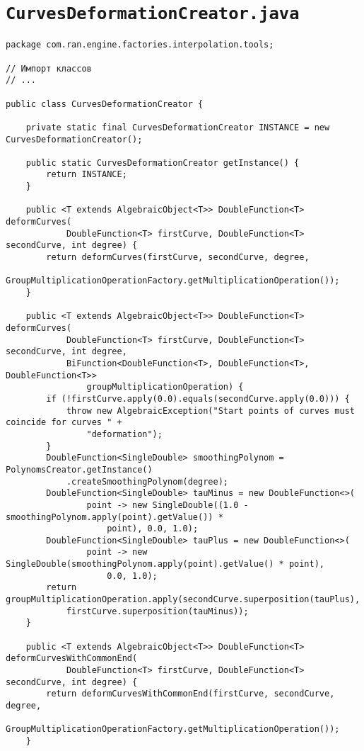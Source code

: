\section*{\texttt{CurvesDeformationCreator.java}}
\begin{verbatim}
package com.ran.engine.factories.interpolation.tools;

// Импорт классов
// ...

public class CurvesDeformationCreator {

    private static final CurvesDeformationCreator INSTANCE = new CurvesDeformationCreator();

    public static CurvesDeformationCreator getInstance() {
        return INSTANCE;
    }

    public <T extends AlgebraicObject<T>> DoubleFunction<T> deformCurves(
            DoubleFunction<T> firstCurve, DoubleFunction<T> secondCurve, int degree) {
        return deformCurves(firstCurve, secondCurve, degree,
                GroupMultiplicationOperationFactory.getMultiplicationOperation());
    }

    public <T extends AlgebraicObject<T>> DoubleFunction<T> deformCurves(
            DoubleFunction<T> firstCurve, DoubleFunction<T> secondCurve, int degree,
            BiFunction<DoubleFunction<T>, DoubleFunction<T>, DoubleFunction<T>>
                groupMultiplicationOperation) {
        if (!firstCurve.apply(0.0).equals(secondCurve.apply(0.0))) {
            throw new AlgebraicException("Start points of curves must coincide for curves " +
                "deformation");
        }
        DoubleFunction<SingleDouble> smoothingPolynom = PolynomsCreator.getInstance()
            .createSmoothingPolynom(degree);
        DoubleFunction<SingleDouble> tauMinus = new DoubleFunction<>(
                point -> new SingleDouble((1.0 - smoothingPolynom.apply(point).getValue()) *
                    point), 0.0, 1.0);
        DoubleFunction<SingleDouble> tauPlus = new DoubleFunction<>(
                point -> new SingleDouble(smoothingPolynom.apply(point).getValue() * point),
                    0.0, 1.0);
        return groupMultiplicationOperation.apply(secondCurve.superposition(tauPlus),
            firstCurve.superposition(tauMinus));
    }

    public <T extends AlgebraicObject<T>> DoubleFunction<T> deformCurvesWithCommonEnd(
            DoubleFunction<T> firstCurve, DoubleFunction<T> secondCurve, int degree) {
        return deformCurvesWithCommonEnd(firstCurve, secondCurve, degree,
                GroupMultiplicationOperationFactory.getMultiplicationOperation());
    }


\end{verbatim}

